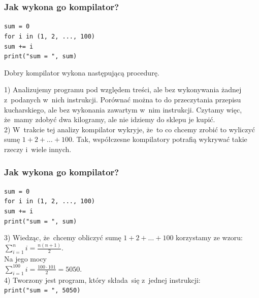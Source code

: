 \documentclass[10pt,t]{beamer}
\begin{document}
\begin{frame}
  \frametitle{Jak wykona go kompilator?}


  \texttt{sum = 0} \\

  \texttt{for i in (1, 2, ..., 100)} \\
  \hphantom{aaaa} \texttt{sum += i} \\

  \texttt{print("sum = ", sum)}

  Dobry kompilator wykona następującą procedurę.

  1) Analizujemy programu pod względem treści, ale \alert{bez}
  wykonywania żadnej z~podanych w~nich instrukcji. Porównać można
  to do przeczytania przepisu kucharskiego, ale bez wykonania zawartym
  w~nim instrukcji. Czytamy więc, że~mamy zdobyć dwa kilogramy, ale
  nie idziemy do sklepu je kupić. \\
  2) W~trakcie tej analizy kompilator wykryje, że~to co chcemy
  zrobić to wyliczyć sumę $1 + 2 + \ldots + 100$. Tak, współczesne kompilatory
  potrafią wykrywać takie rzeczy i~wiele innych.

\end{frame}





\begin{frame}
  \frametitle{Jak wykona go kompilator?}


  \texttt{sum = 0} \\

  \texttt{for i in (1, 2, ..., 100)} \\
  \hphantom{aaaa} \texttt{sum += i} \\

  \texttt{print("sum = ", sum)}

  3) Wiedząc, że~chcemy obliczyć sumę $1 + 2 + \ldots + 100$ korzystamy
  ze wzoru: \\[0.3em]
  $\displaystyle \sum_{ i = 1 }^{ n } i = \frac{ n ( n + 1 ) }{ 2 }$. \\[0.5em]
  Na jego mocy \\[0.3em]
  $\displaystyle \sum_{ i = 1 }^{ 100 } i = \frac{ 100 \cdot 101 }{ 2 } = 5050$.
  \\[0.5em]
  4) Tworzony jest program, który składa~się z~jednej instrukcji: \\
  \texttt{print("sum = ", 5050)}

\end{frame}
\end{document}
